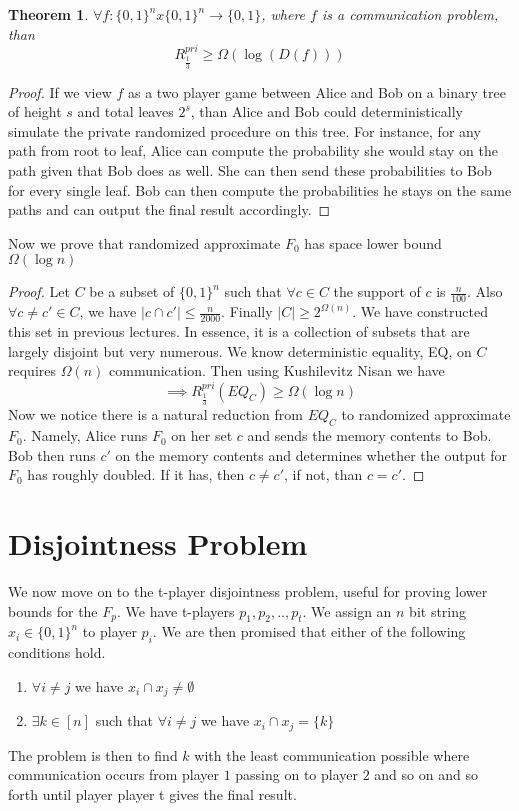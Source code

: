 \documentclass[11pt]{article}
\newtheorem{theorem}{Theorem}
\begin{document}
\begin{theorem}
$\forall f: \{0,1\}^n x \{0,1\}^n \rightarrow \{0,1\}$, where $f$ is a communication problem, than 
$$R_{\frac{1}{3}}^{pri} \geq \Omega(\log(D(f)))$$  
\end{theorem}  
\begin{proof}
If we view $f$ as a two player game between Alice and Bob on a binary tree of height $s$ and total leaves $2^s$, than Alice and Bob could deterministically simulate the private randomized procedure on this tree.  For instance, for any path from root to leaf, Alice can compute the probability she would stay on the path given that Bob does as well.  She can then send these probabilities to Bob for every single leaf.  Bob can then compute the probabilities he stays on the same paths and can output the final result accordingly.  
\end{proof}

Now we prove that randomized approximate $F_0$ has space lower bound $\Omega(\log n)$
\begin{proof}
Let $C$ be a subset of $\{0,1\}^n$ such that $\forall c \in C$ the support of $c$ is $\frac{n}{100}$.  Also $\forall c \neq c' \in C$, we have $|c \cap c'| \leq \frac{n}{2000}$.  Finally $|C| \geq 2^{\Omega(n)}$.  We have constructed this set in previous lectures.  In essence, it is a collection of subsets that are largely disjoint but very numerous.  We know deterministic equality, EQ, on $C$ requires $\Omega(n)$ communication.  Then using Kushilevitz Nisan we have
$$ \implies R_{\frac{1}{3}}^{pri}(EQ_C) \geq \Omega(\log n)$$ 
Now we notice there is a natural reduction from $EQ_C$ to randomized approximate $F_0$.  Namely, Alice runs $F_0$ on her set $c$ and sends the memory contents to Bob.  Bob then runs $c'$ on the memory contents and determines whether the output for $F_0$ has roughly doubled.  If it has, then $c \neq c'$, if not, than $c = c'$.  
\end{proof}

\section{Disjointness Problem}
We now move on to the t-player disjointness problem, useful for proving lower bounds for the $F_p$.  We have t-players $p_1, p_2, .., p_t$.  We assign an $n$ bit string $x_i \in \{0,1\}^n$ to player $p_i$.  We are then promised that either of the following conditions hold.  
\begin{enumerate}
\item $\forall i \neq j$ we have $x_i \cap x_j \neq \emptyset$  
\item $\exists k \in [n]$ such that $\forall i \neq j$ we have $x_i \cap x_j = \{k\}$
\end{enumerate}
The problem is then to find $k$ with the least communication possible where communication occurs from player $1$ passing on to player $2$ and so on and so forth until player player t gives the final result.  \\
\end{document}
